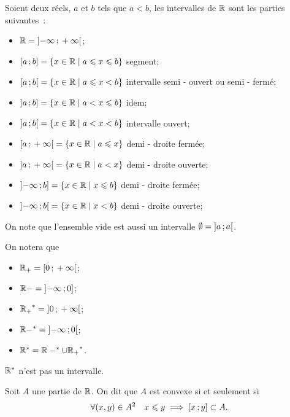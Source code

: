 \begin{defdef}
  Soient deux réels, \(a\) et \(b\) tels que \(a<b\), les intervalles de \(\mathbb{R}\)
  sont les parties suivantes~:
  \begin{itemize}
    \item \(\mathbb{R} = \left]  - \infty \, ; {}  + \infty \right[\);
    \item \(\left[ a \, ; {} b \right] = \left\{x \in \mathbb{R}\mathrel{}\middle|\mathrel{}a\leqslant x \leqslant b\right\}\)
      segment;
    \item \(\left[ a \, ; {} b \right[ = \left\{x \in \mathbb{R}\mathrel{}\middle|\mathrel{}a\leqslant x < b\right\}\)
      intervalle semi - ouvert ou semi - fermé;
    \item \(\left] a \, ; {} b \right] = \left\{x \in \mathbb{R}\mathrel{}\middle|\mathrel{}a< x \leqslant b\right\}\) idem;
    \item \(\left] a \, ; {} b \right[ = \left\{x \in \mathbb{R}\mathrel{}\middle|\mathrel{}a< x < b\right\}\) intervalle
      ouvert;
    \item \(\left[ a \, ; {}  + \infty \right[ = \left\{x \in \mathbb{R}\mathrel{}\middle|\mathrel{}a\leqslant x\right\}\) demi
      - droite fermée;
    \item \(\left] a \, ; {}  + \infty \right[ = \left\{x \in \mathbb{R}\mathrel{}\middle|\mathrel{}a< x\right\}\) demi - droite
      ouverte;
    \item \(\left]  - \infty \, ; {} b \right] = \left\{x \in \mathbb{R}\mathrel{}\middle|\mathrel{}x \leqslant b\right\}\) demi
      - droite fermée;
    \item \(\left]  - \infty \, ; {} b \right[ = \left\{x \in \mathbb{R}\mathrel{}\middle|\mathrel{}x <b\right\}\) demi - droite
      ouverte;
  \end{itemize}
\end{defdef}
On note que l'ensemble vide est aussi un intervalle \(\emptyset =
\left] a \, ; {} a \right[\).
\begin{defdef}
  On notera que
  \begin{itemize}
    \item \(\mathbb{R}_{+} = \left[ 0 \, ; {}  + \infty \right[\);
    \item \(\mathbb{R}- = \left]  - \infty \, ; {} 0 \right]\);
    \item \({\mathbb{R}_{+}}^* = \left] 0 \, ; {}  + \infty \right[\);
    \item \(\mathbb{R} - ^* = \left]  - \infty \, ; {} 0 \right[\);
    \item \(\mathbb{R}^* = \mathbb{R} - ^* \cup {\mathbb{R}_{+}}^*\).
  \end{itemize}
  \(\mathbb{R}^*\) n'est pas un intervalle.
\end{defdef}
\begin{defdef}
  Soit \(A\) une partie de \(\mathbb{R}\). On dit que \(A\) est convexe si et seulement
  si
  \begin{equation}
    \forall (x, y) \in A^2 \quad x\leqslant y \implies
    \left[ x \, ; {} y \right]\subset A.
  \end{equation}
\end{defdef}
